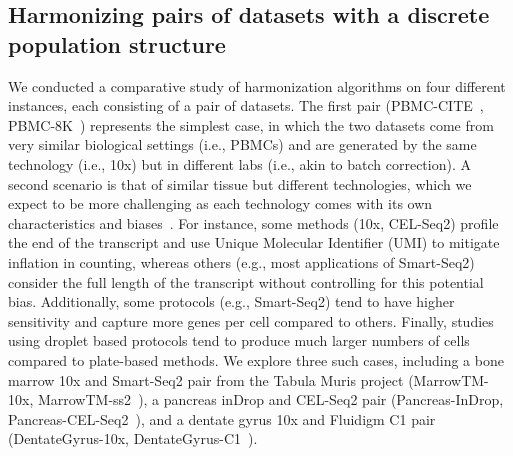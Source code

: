  



\subsection{Harmonizing pairs of datasets with a discrete population structure}
We conducted a comparative study of harmonization algorithms on four different instances, each consisting of a pair of datasets. The first pair (PBMC-CITE~\cite{stoeckius2017simultaneous}, PBMC-8K~\cite{10x}) represents the simplest case, in which the two datasets come from very similar biological settings (i.e., PBMCs) and are generated by the same technology (i.e., 10x) but in different labs (i.e., akin to batch correction). A second scenario is that of similar tissue but different technologies, which we expect to be more challenging as each technology comes with its own characteristics and biases~\cite{Ziegenhain2017}. For instance, some methods (10x, CEL-Seq2) profile the end of the transcript and use Unique Molecular Identifier (UMI) to mitigate inflation in counting, whereas others (e.g., most applications of Smart-Seq2) consider the full length of the transcript without controlling for this potential bias. Additionally, some protocols (e.g., Smart-Seq2) tend to have higher sensitivity and capture more genes per cell compared to others. Finally, studies using droplet based protocols tend to produce much larger numbers of cells compared to plate-based methods. We explore three such cases, including a bone marrow 10x and Smart-Seq2 pair from the Tabula Muris project (MarrowTM-10x, MarrowTM-ss2~\cite{quake2018single}), a pancreas inDrop and CEL-Seq2 pair (Pancreas-InDrop, Pancreas-CEL-Seq2~\cite{pancreasindrop}), and a dentate gyrus 10x and Fluidigm C1 pair (DentateGyrus-10x, DentateGyrus-C1~\cite{dentategyrus2018}). 

